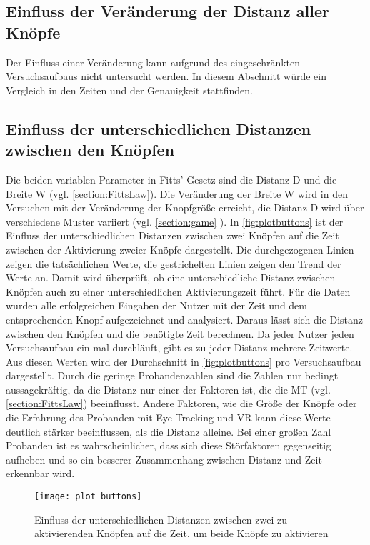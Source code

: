 \subsection{Einfluss der Veränderung der Distanz aller Knöpfe}
Der Einfluss einer Veränderung kann aufgrund des eingeschränkten Versuchsaufbaus nicht untersucht werden. In diesem Abschnitt würde ein Vergleich in den Zeiten und der Genauigkeit stattfinden.

\subsection{Einfluss der unterschiedlichen Distanzen zwischen den Knöpfen}
Die beiden variablen Parameter in Fitts' Gesetz sind die Distanz D und die Breite W (vgl. \autoref{section:FittsLaw}). Die Veränderung der Breite W wird in den Versuchen mit der Veränderung der Knopfgröße erreicht, die Distanz D wird über verschiedene Muster variiert (vgl. \autoref{section:game} ). In \autoref{fig:plotbuttons} ist der Einfluss der unterschiedlichen Distanzen zwischen zwei Knöpfen auf die Zeit zwischen der Aktivierung zweier Knöpfe dargestellt. Die durchgezogenen Linien zeigen die tatsächlichen Werte, die gestrichelten Linien zeigen den Trend der Werte an. Damit wird überprüft, ob eine unterschiedliche Distanz zwischen Knöpfen auch zu einer unterschiedlichen Aktivierungszeit führt. Für die Daten wurden alle erfolgreichen Eingaben der Nutzer mit der Zeit und dem entsprechenden Knopf aufgezeichnet und analysiert. Daraus lässt sich die Distanz zwischen den Knöpfen und die benötigte Zeit berechnen. Da jeder Nutzer jeden Versuchsaufbau ein mal durchläuft, gibt es zu jeder Distanz mehrere Zeitwerte. Aus diesen Werten wird der Durchschnitt in \autoref{fig:plotbuttons} pro Versuchsaufbau dargestellt. Durch die geringe Probandenzahlen sind die Zahlen nur bedingt aussagekräftig, da die Distanz nur einer der Faktoren ist, die die \ac{MT} (vgl. \autoref{section:FittsLaw}) beeinflusst. Andere Faktoren, wie die Größe der Knöpfe oder die Erfahrung des Probanden mit Eye-Tracking und VR kann diese Werte deutlich stärker beeinflussen, als die Distanz alleine. Bei einer großen Zahl Probanden ist es wahrscheinlicher, dass sich diese Störfaktoren gegenseitig aufheben und so ein besserer Zusammenhang zwischen Distanz und Zeit erkennbar wird. 
\begin{figure}[!htbp]
	\centering
	\texttt{[image: plot\_buttons]}
	\caption[Einfluss der unterschiedlichen Distanzen zwischen zwei zu aktivierenden Knöpfen auf die Zeit, um beide Knöpfe zu aktivieren]{Einfluss der unterschiedlichen Distanzen zwischen zwei zu aktivierenden Knöpfen auf die Zeit, um beide Knöpfe zu aktivieren}
	\label{fig:plotbuttons}
\end{figure}
